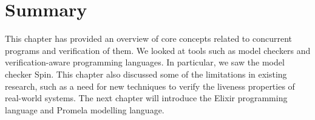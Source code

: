 \section{Summary}
This chapter has provided an overview of core concepts related to concurrent programs and verification of them. We looked at tools such as model checkers and verification-aware programming languages. In particular, we saw the model checker Spin. This chapter also discussed some of the limitations in existing research, such as a need for new techniques to verify the liveness properties of real-world systems. The next chapter will introduce the Elixir programming language and Promela modelling language.

